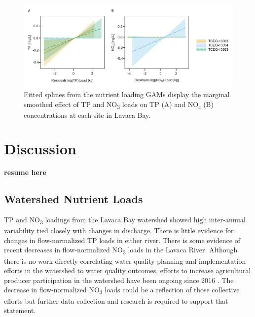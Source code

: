 \documentclass[sn-basic,referee,lineno,pdflatex]{sn-jnl}
\begin{document}
\begin{figure}

{\centering \includegraphics[width=1\linewidth,]{Schramm-2023-05-AS_files/figure-latex/fig7-1} 

}

\caption{Fitted splines from the nutrient loading GAMs display the marginal smoothed effect of TP and NO\textsubscript{3} loads on TP (A) and NO\textsubscript{\textit{x}} (B) concentrations at each site in Lavaca Bay.}\label{fig:fig7}
\end{figure}

\hypertarget{sec4}{%
\section{Discussion}\label{sec4}}

\textbf{resume here}

\hypertarget{watershed-nutrient-loads-1}{%
\subsection{Watershed Nutrient Loads}\label{watershed-nutrient-loads-1}}

TP and NO\textsubscript{3} loadings from the Lavaca Bay watershed showed
high inter-annual variability tied closely with changes in discharge.
There is little evidence for changes in flow-normalized TP loads in
either river. There is some evidence of recent decreases in
flow-normalized NO\textsubscript{3} loads in the Lavaca River. Although
there is no work directly correlating water quality planning and
implementation efforts in the watershed to water quality outcomes,
efforts to increase agricultural producer participation in the watershed
have been ongoing since 2016
\citep{schrammLavacaRiverWatershed2018, bertholdDirectMailingEducation2021}.
The decrease in flow-normalized NO\textsubscript{3} loads could be a
reflection of those collective efforts but further data collection and
research is required to support that statement.
\end{document}
